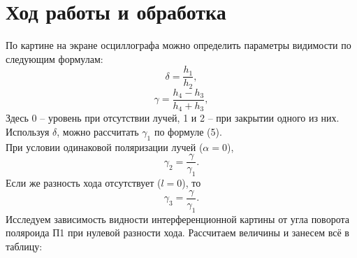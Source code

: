 \documentclass[a4paper, 12pt]{article}
\begin{document}
\section{Ход работы и обработка}

По картине на экране осциллографа можно определить параметры видимости по следующим формулам:
\begin{equation}
\delta = \dfrac{h_1}{h_2},
\end{equation}
\begin{equation}
\gamma = \dfrac{h_4 - h_3}{h_4 + h_3},
\end{equation}
Здесь 0 -- уровень при отсутствии лучей, 1 и 2 -- при закрытии одного из них. Используя $\delta$, можно рассчитать $\gamma_1$ по формуле (5).\\ 
При условии одинаковой поляризации лучей ($\alpha = 0$),
\begin{equation}
\gamma_2 = \dfrac{\gamma}{\gamma_1}.
\end{equation}
Если же разность хода отсутствует ($l = 0$), то
\begin{equation}
\gamma_3 = \dfrac{\gamma}{\gamma_1}.
\end{equation}
Исследуем зависимость видности интерференционной картины от угла поворота поляроида П1 при нулевой разности хода. Рассчитаем величины и занесем всё в таблицу:
\end{document}
